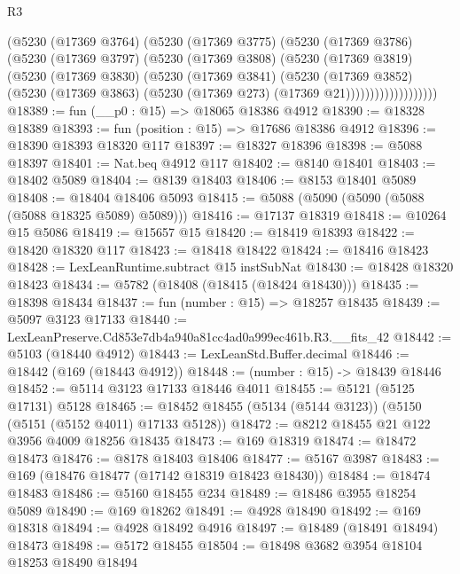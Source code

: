 \begin{lexlean}{R3}
\begin{coremodule}
                  (@5230
                    (@17369 @3764)
                    (@5230
                      (@17369 @3775)
                      (@5230
                        (@17369 @3786)
                        (@5230
                          (@17369 @3797)
                          (@5230
                            (@17369 @3808)
                            (@5230
                              (@17369 @3819)
                              (@5230
                                (@17369 @3830)
                                (@5230
                                  (@17369 @3841)
                                  (@5230
                                    (@17369 @3852)
                                    (@5230
                                      (@17369 @3863)
                                      (@5230 (@17369 @273) (@17369 @21)))))))))))))))))))
@18389 := fun (__p0 : @15) => @18065 @18386 @4912
@18390 := @18328 @18389
@18393 := fun (position : @15) => @17686 @18386 @4912
@18396 := @18390 @18393 @18320 @117
@18397 := @18327 @18396
@18398 := @5088 @18397
@18401 := Nat.beq @4912 @117
@18402 := @8140 @18401
@18403 := @18402 @5089
@18404 := @8139 @18403
@18406 := @8153 @18401 @5089
@18408 := @18404 @18406 @5093
@18415 := @5088 (@5090 (@5090 (@5088 (@5088 @18325 @5089) @5089)))
@18416 := @17137 @18319
@18418 := @10264 @15 @5086
@18419 := @15657 @15
@18420 := @18419 @18393
@18422 := @18420 @18320 @117
@18423 := @18418 @18422
@18424 := @18416 @18423
@18428 := LexLeanRuntime.subtract @15 instSubNat
@18430 := @18428 @18320 @18423
@18434 := @5782 (@18408 (@18415 (@18424 @18430)))
@18435 := @18398 @18434
@18437 := fun (number : @15) => @18257 @18435
@18439 := @5097 @3123 @17133
@18440 := LexLeanPreserve.Cd853e7db4a940a81cc4ad0a999ec461b.R3.__fits_42
@18442 := @5103 (@18440 @4912)
@18443 := LexLeanStd.Buffer.decimal
@18446 := @18442 (@169 (@18443 @4912))
@18448 := (number : @15) -> @18439 @18446
@18452 := @5114 @3123 @17133 @18446 @4011
@18455 := @5121 (@5125 @17131) @5128
@18465 := @18452 @18455 (@5134 (@5144 @3123)) (@5150 (@5151 (@5152 @4011) @17133 @5128))
@18472 := @8212 @18455 @21 @122 @3956 @4009 @18256 @18435
@18473 := @169 @18319
@18474 := @18472 @18473
@18476 := @8178 @18403 @18406
@18477 := @5167 @3987
@18483 := @169 (@18476 @18477 (@17142 @18319 @18423 @18430))
@18484 := @18474 @18483
@18486 := @5160 @18455 @234
@18489 := @18486 @3955 @18254 @5089
@18490 := @169 @18262
@18491 := @4928 @18490
@18492 := @169 @18318
@18494 := @4928 @18492 @4916
@18497 := @18489 (@18491 @18494) @18473
@18498 := @5172 @18455
@18504 := @18498 @3682 @3954 @18104 @18253 @18490 @18494

\end{coremodule}
\end{lexlean}
